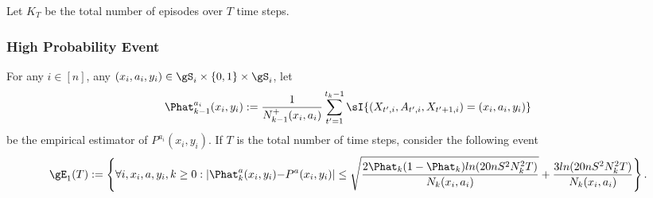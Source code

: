 Let $K_T$ be the total number of episodes over $T$ time steps.

\subsubsection{High Probability Event}
\label{sssec:high_event}

For any $i\in[n]$, any $(x_i,a_i,y_i)\in\gS_i\times\{0,1\}\times\gS_i$, let $${\Phat_{k-1}^{a_i}(x_i,y_i):=\frac1{N^+_{k-1}(x_i,a_i)}\sum_{t'=1}^{t_k-1}\sI{(X_{t',i},A_{t',i},X_{t'+1,i})=(x_i,a_i,y_i)}}$$ be the empirical estimator of $P^{a_i}(x_i,y_i)$.%
If $T$ is the total number of time steps, consider the following event
\begin{align}
    \gE_1(T):=\left\{\forall i,x_i,a,y_i,k\ge0: |\Phat_k^a(x_i,y_i) {-}P^a(x_i,y_i)|\le \sqrt{\frac{2\Phat_k(1-\Phat_k)ln(20nS^2N_k^2T)}{N_k(x_i,a_i)}} +\frac{3ln(20nS^2N_k^2T)}{N_k(x_i,a_i)}\right\}. \label{eq:event_1}
\end{align}

